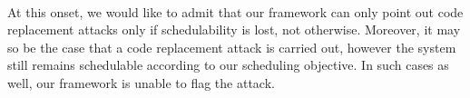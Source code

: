 ~\\
\noindent
At this onset, we would like to admit that our framework can only point out code replacement attacks only if schedulability is lost, not otherwise. Moreover, it may so be the case that a code replacement attack is carried out, however the system still remains schedulable according to our scheduling objective. In such cases as well, our framework is unable to flag the attack.